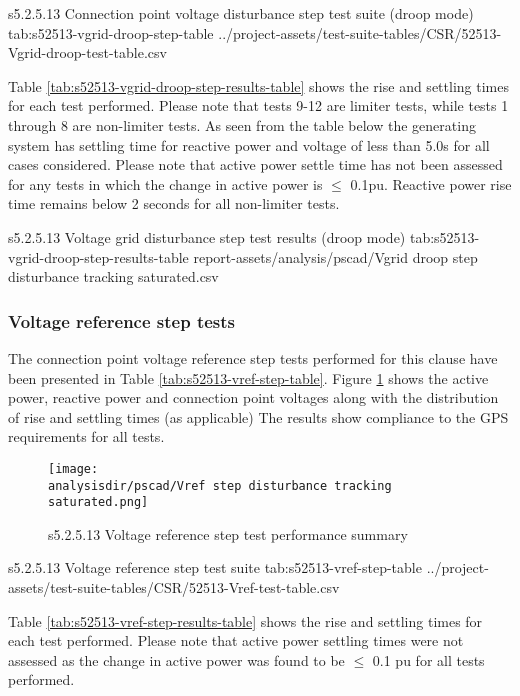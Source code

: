 \documentclass{../grid-link-report}
\newcommand{\projectassetsdir}{../project-assets}
\newcommand{\analysisdir}{report-assets/analysis}
\begin{document}
	{
		\fontsize{7}{8}\selectfont
		\autoscaledlongtable
		{s5.2.5.13 Connection point voltage disturbance step test suite (droop mode)}
		{tab:s52513-vgrid-droop-step-table}
		{\projectassetsdir/test-suite-tables/CSR/52513-Vgrid-droop-test-table.csv}
	}

	Table \ref{tab:s52513-vgrid-droop-step-results-table} shows the rise and settling times for each test performed. Please note that tests 9-12 are limiter tests, while tests 1 through 8 are non-limiter tests. As seen from the table below the generating system has settling time for reactive power and voltage of less than 5.0s for all cases considered. Please note that active power settle time has not been assessed for any tests in which the change in active power is $\leq$ 0.1pu. Reactive power rise time remains below 2 seconds for all non-limiter tests.
	
	{
		\fontsize{6.5}{11}\selectfont
		\autoscaledlongtable
		{s5.2.5.13 Voltage grid disturbance step test results (droop mode)}
		{tab:s52513-vgrid-droop-step-results-table}
		{report-assets/analysis/pscad/Vgrid droop step disturbance tracking saturated.csv}
	}
	
	
	\subsubsection{Voltage reference step tests}
	
	The connection point voltage reference step tests performed for this clause have been presented in Table \ref{tab:s52513-vref-step-table}. Figure \ref{fig:s52513-vref-step-saturated-summary-plot} shows the active power, reactive power and connection point voltages along with the distribution of rise and settling times (as applicable) The results show compliance to the GPS requirements for all tests.
	
	
	\begin{figure}[H]
		\centering
		\texttt{[image: \\analysisdir/pscad/Vref step disturbance tracking saturated.png]}
		\caption{s5.2.5.13 Voltage reference step test performance summary}
		\label{fig:s52513-vref-step-saturated-summary-plot}
	\end{figure}
	
	{
		\fontsize{9}{8}\selectfont
		\autoscaledlongtable
		{s5.2.5.13 Voltage reference step test suite}
		{tab:s52513-vref-step-table}
		{\projectassetsdir/test-suite-tables/CSR/52513-Vref-test-table.csv}
	}

	Table \ref{tab:s52513-vref-step-results-table} shows the rise and settling times for each test performed. Please note that active power settling times were not assessed as the change in active power was found to be $\leq$ 0.1 pu for all tests performed.
	
\end{document}
